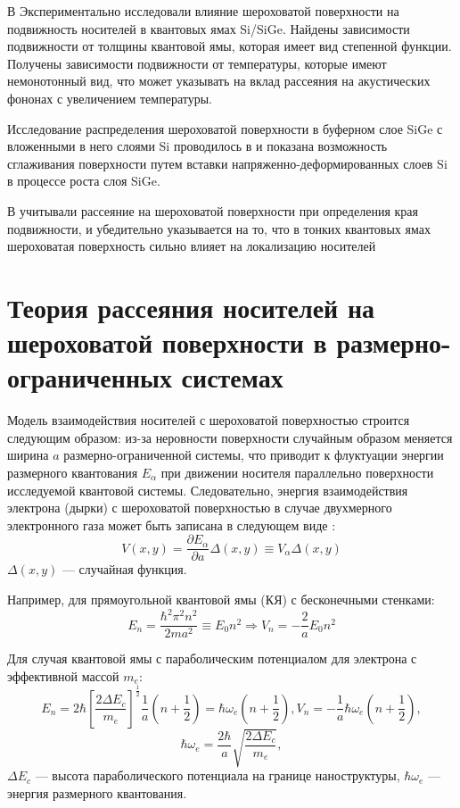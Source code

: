 В \cite{Yutani1996} Экспериментально исследовали влияние шероховатой поверхности на подвижность носителей в квантовых ямах Si/SiGe. Найдены зависимости подвижности от толщины квантовой ямы, которая имеет вид степенной функции. Получены зависимости подвижности от температуры, которые имеют немонотонный вид, что может указывать на вклад рассеяния на акустических фононах с увеличением температуры.

Исследование распределения шероховатой поверхности в буферном слое SiGe с вложенными в него слоями Si проводилось в \cite{Yoon2005} и показана возможность сглаживания поверхности путем вставки напряженно-деформированных слоев Si в процессе роста слоя SiGe.

В \cite{Tito2017} учитывали рассеяние на шероховатой поверхности при определения края подвижности, и убедительно указывается на то, что в тонких квантовых ямах шероховатая поверхность сильно влияет на локализацию носителей


\section{Теория рассеяния носителей на шероховатой поверхности в размерно-ограниченных системах} \label{sect1_2}
Модель взаимодействия носителей с шероховатой поверхностью строится следующим образом: из-за неровности поверхности случайным образом меняется ширина $a$ размерно-ограниченной системы, что приводит к флуктуации энергии размерного квантования $E_{\alpha}$ при движении носителя параллельно поверхности исследуемой квантовой системы. Следовательно, энергия взаимодействия электрона (дырки) с шероховатой поверхностью в случае двухмерного электронного газа может быть записана в следующем виде \cite{Sakaki1987}:
\begin{equation}
\label{eq:1_1}
V(x,y)=\frac{\partial E_{\alpha}}{\partial a}\Delta(x,y)\equiv V_{\alpha} \Delta(x,y)
\end{equation}
$\Delta(x,y)$ --- случайная функция.

Например, для прямоугольной квантовой ямы (КЯ) с бесконечными стенками:
\begin{equation}
\label{eq:1_2}
E_n = \frac{\hbar^2 \pi^2 n^2}{2ma^2} \equiv E_0 n^2 \Rightarrow V_n = -\frac{2}{a}E_0 n^2
\end{equation}

Для случая квантовой ямы с параболическим потенциалом для электрона с эффективной массой $m_e$:
\begin{equation}
\label{eq:1_3}
E_n=2\hbar \left[ \frac{2\Delta E_c} {m_e} \right]^\frac{1}{2} \frac{1}{a}\left( n + \frac{1}{2} \right) = \hbar \omega_e \left( n + \frac{1}{2} \right), V_n = -\frac{1}{a} \hbar \omega_e \left( n + \frac{1}{2} \right),
\end{equation}
\[
\hbar \omega_e = \frac{2\hbar}{a}\sqrt{\frac{2 \Delta E_c}{m_e}},
\]
$\Delta E_c$ --- высота параболического потенциала на границе наноструктуры, $\hbar \omega_e$ --- энергия размерного квантования.

